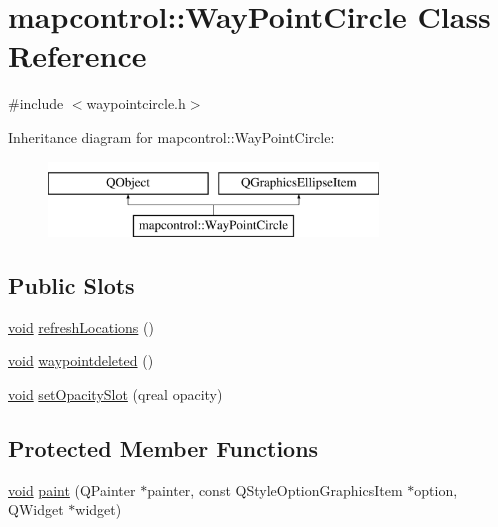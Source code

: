 \hypertarget{classmapcontrol_1_1_way_point_circle}{\section{mapcontrol\-:\-:Way\-Point\-Circle Class Reference}
\label{classmapcontrol_1_1_way_point_circle}
}


{\ttfamily \#include $<$waypointcircle.\-h$>$}

Inheritance diagram for mapcontrol\-:\-:Way\-Point\-Circle\-:\begin{figure}[H]
\begin{center}
\leavevmode
\includegraphics[height=2.000000cm]{classmapcontrol_1_1_way_point_circle}
\end{center}
\end{figure}
\subsection*{Public Slots}
\begin{DoxyCompactItemize}
\item 
\hyperlink{group___u_a_v_objects_plugin_ga444cf2ff3f0ecbe028adce838d373f5c}{void} \hyperlink{group___o_p_map_widget_ga56684f440455598d530b5952c5b0d640}{refresh\-Locations} ()
\item 
\hyperlink{group___u_a_v_objects_plugin_ga444cf2ff3f0ecbe028adce838d373f5c}{void} \hyperlink{group___o_p_map_widget_ga25a712ca0ed34f0163763e1244f9cee8}{waypointdeleted} ()
\item 
\hyperlink{group___u_a_v_objects_plugin_ga444cf2ff3f0ecbe028adce838d373f5c}{void} \hyperlink{group___o_p_map_widget_ga4dcdc126c105f68278a330efd6e8e590}{set\-Opacity\-Slot} (qreal opacity)
\end{DoxyCompactItemize}
\subsection*{Protected Member Functions}
\begin{DoxyCompactItemize}
\item 
\hyperlink{group___u_a_v_objects_plugin_ga444cf2ff3f0ecbe028adce838d373f5c}{void} \hyperlink{group___o_p_map_widget_ga90e225e45f660d413d4d7ecac9bda3d9}{paint} (Q\-Painter $\ast$painter, const Q\-Style\-Option\-Graphics\-Item $\ast$option, Q\-Widget $\ast$widget)
\end{DoxyCompactItemize}



